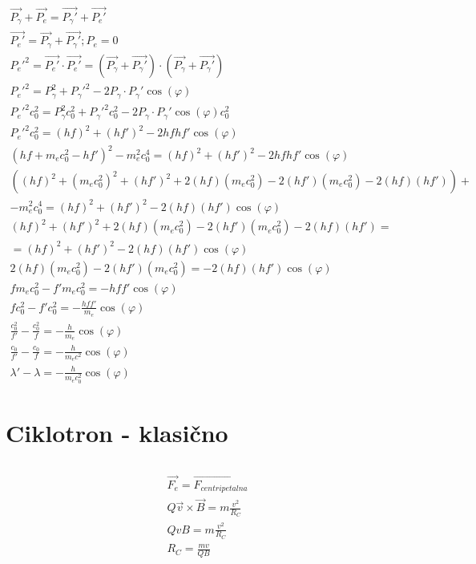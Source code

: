 \documentclass[a4paper,12pt]{article}
\begin{document}
\subsection{}
\begin{align}
    \vec{P_\gamma} + \vec{P_e} = \vec{P_\gamma'} + \vec{P_e'} \\
    \vec{P_e'} = \vec{P_\gamma} + \vec{P_\gamma'}; P_e = 0 \\
    P_e'^2 = \vec{P_e'} \cdot \vec{P_e'} = (\vec{P_\gamma} + \vec{P_\gamma'}) \cdot (\vec{P_\gamma} + \vec{P_\gamma'}) \\
    P_e'^2 = P_\gamma^2 + P_\gamma'^2 - 2P_\gamma \cdot P_\gamma' \cos(\varphi) \\
    P_e'^2 c_0^2 = P_\gamma^2 c_0^2 + P_\gamma'^2 c_0^2 - 2P_\gamma \cdot P_\gamma' \cos(\varphi) c_0^2 \\
    P_e'^2 c_0^2 = (hf)^2 + (hf')^2 - 2hf hf' \cos(\varphi) \\
    (hf + m_e c_0^2 - hf')^2 - m_e^2 c_0^4  = (hf)^2 + (hf')^2 - 2hf hf' \cos(\varphi) \\
    ((hf)^2 + (m_e c_0^2)^2 + (hf')^2 + 2(hf)(m_e c_0^2) - 2(hf')(m_e c_0^2) - 2(hf)(hf')) + \nonumber \\
    - m_e^2 c_0^4 = (hf)^2 + (hf')^2 - 2(hf)(hf') \cos(\varphi) \\
    (hf)^2 + (hf')^2 + 2(hf)(m_e c_0^2) - 2(hf')(m_e c_0^2) - 2(hf)(hf') = \nonumber \\
    = (hf)^2 + (hf')^2 - 2(hf)(hf') \cos(\varphi) \\
    2(hf)(m_e c_0^2) - 2(hf')(m_e c_0^2) = -2(hf)(hf') \cos(\varphi) \\
    f m_e c_0^2 - f' m_e c_0^2 = - h f f' \cos(\varphi) \\
    f c_0^2 - f' c_0^2 = - \frac{h f f'}{m_e} \cos(\varphi) \\
    \frac{c_0^2}{f'} - \frac{c_0^2}{f} = - \frac{h}{m_e} \cos(\varphi) \\
    \frac{c_0}{f'} - \frac{c_0}{f} = - \frac{h}{m_e c^2} \cos(\varphi) \\
    \lambda' - \lambda = - \frac{h}{m_e c_0^2} \cos(\varphi)
\end{align}


\newpage
\section{Ciklotron - klasično}
\subsection{}
\begin{align}
    \vec{F_e} = \vec{F_{centripetalna}} \\
    Q \vec{v} \times \vec{B} = m \frac{v^2}{R_C} \\
    Q v B = m \frac{v^2}{R_C} \\
    R_C = \frac{m v}{Q B}
\end{align}
\end{document}
